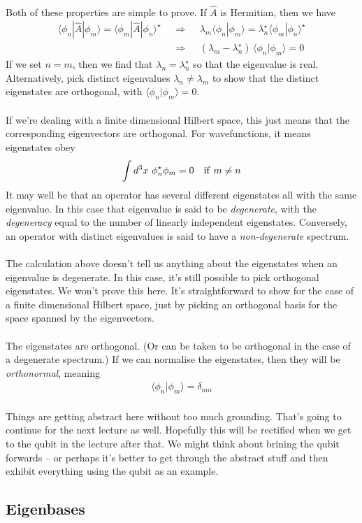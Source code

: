 \documentclass[12pt]{article}
\def\be{\begin{eqnarray}}
\def\ee{\end{eqnarray}}
\newcommand{\nn}{\nonumber}
\newcommand\para{\paragraph{}}
\newcommand{\ket}[1]{|#1\rangle}
\newcommand{\bra}[1]{\langle#1|}
\newcommand{\co}{\color{olive}}
\newcommand{\cblue}{\color{blue}}
\begin{document}
{\para
{\co Both of these properties are simple to prove.  If $\hat{A}$ is Hermitian, then we have
%
\be \bra{\phi_n}\hat{A}\ket{\phi_m} = \bra{\phi_m}\hat{A}\ket{\phi_n}^\star\ \ \ &\Longrightarrow&\ \ \  \lambda_m \bra{\phi_n}{\phi_m}\rangle = \lambda_n^\star\bra{\phi_m}{\phi_n}\rangle^\star\nn\\
&\Longrightarrow&\ \ \ (\lambda_m -\lambda_n^\star)\,\bra{\phi_n}{\phi_m}\rangle=0\nn\ee
%
If we set  $n=m$, then we find that $\lambda_n=\lambda^\star_n$ so that the eigenvalue is real. Alternatively, pick distinct eigenvalues $\lambda_n\neq \lambda_m$ to show that the distinct eigenstates are orthogonal, with $\bra{\phi_n}{\phi_m}\rangle=0$.

\para
If we're dealing with a finite dimensional Hilbert space, this just means that the corresponding eigenvectors are orthogonal. For wavefunctions, it means eigenstates obey
%
\be  \int d^3x\ \phi_n^\star\phi_m = 0 \ \ \ {\rm if}\ m\neq n\nn\ee
%
It may well be that an operator has several different eigenstates all with the same eigenvalue. In this case that eigenvalue is said to be {\it degenerate}, with the {\it degeneracy} equal to the number of linearly independent eigenstates. Conversely, an operator with distinct eigenvalues is said to have a {\it non-degenerate} spectrum. }


\para
The calculation above doesn't tell us anything about the eigenstates when an eigenvalue is degenerate. In this case, it's still possible to pick orthogonal eigenstates. We won't prove this here. It's straightforward to show for the case of a finite dimensional Hilbert space, just by picking an orthogonal basis for the space spanned by the eigenvectors. 


\para
{\co The eigenstates are orthogonal.} (Or can be taken to be orthogonal in the case of a degenerate spectrum.) {\co If we can normalise the eigenstates, then they will be {\it orthonormal}, meaning
%
\be \bra{\phi_n}{\phi_m}\rangle = \delta_{mn}\nn\ee
%
}

\para
{\cblue Things are getting abstract here without too much grounding. That's going to continue for the next lecture as well. Hopefully this will be rectified when we get to the qubit in the lecture after that. We might think about brining the qubit forwards -- or perhaps it's better to get through the abstract stuff and then exhibit everything using the qubit as an example.}


\subsection{Eigenbases}

}
\end{document}
